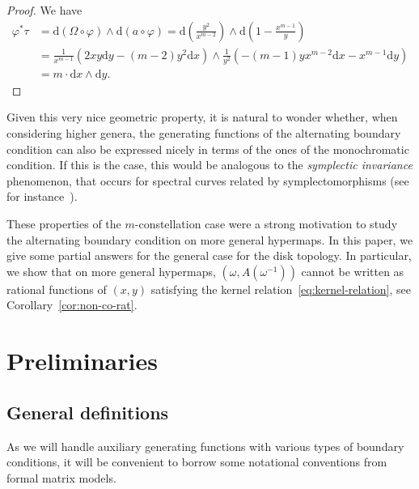 \documentclass{scrartcl}
\newcommand{\dinf}{\mathrm{d}}
\begin{document}
\begin{proof}
We have
\[
\begin{aligned}
\varphi^*\tau&=\dinf(\Omega\circ\varphi)\wedge\dinf(a\circ\varphi)=\dinf\left(\frac{y^2}{x^{m-2}} \right)\wedge\dinf\left(1-\frac{x^{m-1}}{y} \right)\\
&=\frac{1}{x^{m-1}}\left(2xy\dinf y -(m-2)y^2\dinf x \right)\wedge \frac{1}{y^2}\left( -(m-1)yx^{m-2}\dinf x - x^{m-1}\dinf y\right)\\
&=m\cdot \dinf x \wedge \dinf y.
\end{aligned}
\]
\end{proof}

Given this very nice geometric property, it is natural to wonder whether, when considering higher genera, the generating functions of the alternating boundary condition can also be expressed nicely in terms of the ones of the monochromatic condition. If this is the case, this would be analogous to the \emph{symplectic invariance} phenomenon, that occurs for spectral curves related by symplectomorphisms (see for instance~\cite{fully-simple-ciliated-maps}).

These properties of the $m$-constellation case were a strong motivation to study the alternating boundary condition on more general hypermaps. In this paper, we give some partial answers for the general case for the disk topology. In particular, we show that on more general hypermaps, $(\omega,A(\omega^{-1}))$ cannot be written as rational functions of $(x,y)$ satisfying the kernel relation~\eqref{eq:kernel-relation}, see Corollary~\ref{cor:non-co-rat}.

\section{Preliminaries}
\label{sec:def-split}

\subsection{General definitions}
\label{subsec:def-GFs}

As we will handle auxiliary generating functions with various types of boundary conditions, it will be convenient to borrow some notational conventions from formal matrix models.
\end{document}
